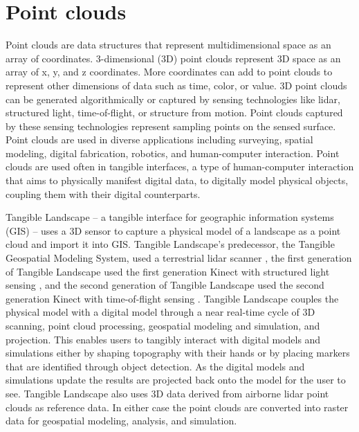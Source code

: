 \documentclass{article}
\begin{document}

\section{Point clouds}
Point clouds are data structures that represent multidimensional space as an array of coordinates. 
%
3-dimensional (3D) point clouds represent 3D space as an array of x, y, and z coordinates. 
%
More coordinates can add to point clouds to represent other dimensions of data such as time, color, or value. 
%
3D point clouds can be generated algorithmically or captured by sensing technologies like lidar, structured light, time-of-flight, or structure from motion. 
%
Point clouds captured by these sensing technologies represent sampling points on the sensed surface. 
%
Point clouds are used in diverse applications including
surveying,
spatial modeling, 
digital fabrication, robotics, and
human-computer interaction. 
%
Point clouds are used often in tangible interfaces, 
a type of human-computer interaction that aims to physically manifest digital data, 
to digitally model physical objects, coupling them with their digital counterparts. 

Tangible Landscape -- a tangible interface for geographic information systems (GIS) -- 
uses a 3D sensor to capture a physical model of a landscape as a point cloud and import it into GIS.
%
Tangible Landscape's predecessor, the Tangible Geospatial Modeling System, used a terrestrial lidar scanner \citep{Tateosian2010},
the first generation of Tangible Landscape used the first generation Kinect with structured light sensing \citep{Petrasova2014}, 
and the second generation of Tangible Landscape used the second generation Kinect with time-of-flight sensing \citep{Petrasova2015}. 
%
Tangible Landscape couples the physical model with a digital model through a near real-time cycle of 
3D scanning, point cloud processing, geospatial modeling and simulation, and projection. 
%
This enables users to tangibly interact with digital models and simulations
either by shaping topography with their hands or 
by placing markers that are identified through object detection. 
%
As the digital models and simulations update
the results are projected back onto the model for the user to see. 
%
Tangible Landscape also uses 3D data derived from airborne lidar point clouds as reference data. 
%
In either case the point clouds are converted into raster data for geospatial modeling, analysis, and simulation.
\end{document}
